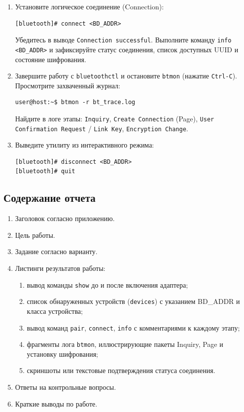 \begin{enumerate}[nosep, leftmargin=*]
    \item Установите логическое соединение (Connection):
    \begin{lstlisting}
[bluetooth]# connect <BD_ADDR>
    \end{lstlisting}
    Убедитесь в выводе \texttt{Connection successful}. Выполните команду \texttt{info <BD\_ADDR>} и зафиксируйте статус соединения, список доступных UUID и состояние шифрования.

    \item Завершите работу с \texttt{bluetoothctl} и остановите \texttt{btmon} (нажатие \texttt{Ctrl-C}). Просмотрите захваченный журнал:
    \begin{lstlisting}
user@host:~$ btmon -r bt_trace.log
    \end{lstlisting}
    Найдите в логе этапы: \texttt{Inquiry}, \texttt{Create Connection} (Page), \texttt{User Confirmation Request} / \texttt{Link Key}, \texttt{Encryption Change}.

    \item Выведите утилиту из интерактивного режима:
    \begin{lstlisting}
[bluetooth]# disconnect <BD_ADDR>
[bluetooth]# quit
    \end{lstlisting}
\end{enumerate}

\subsection{Содержание отчета}
\begin{enumerate}[nosep, leftmargin=*]
    \item Заголовок согласно приложению.
    \item Цель работы.
    \item Задание согласно варианту.
    \item Листинги результатов работы:
    \begin{enumerate}[label=\alph*), nosep]
        \item вывод команды \texttt{show} до и после включения адаптера;
        \item список обнаруженных устройств (\texttt{devices}) с указанием BD\_ADDR и класса устройства;
        \item вывод команд \texttt{pair}, \texttt{connect}, \texttt{info} с комментариями к каждому этапу;
        \item фрагменты лога \texttt{btmon}, иллюстрирующие пакеты Inquiry, Page и установку шифрования;
        \item скриншоты или текстовые подтверждения статуса соединения.
    \end{enumerate}
    \item Ответы на контрольные вопросы.
    \item Краткие выводы по работе.
\end{enumerate}

